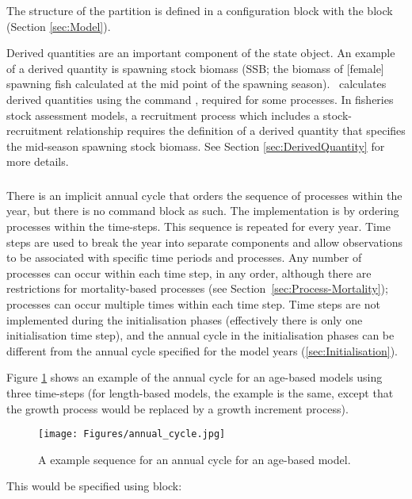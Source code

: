 The structure of the partition is defined in a configuration block with the  block (Section \ref{sec:Model}).

Derived quantities are an important component of the state object. An example of a derived quantity is spawning stock biomass (SSB; the biomass of [female] spawning fish calculated at the mid point of the spawning season). \CNAME\ calculates derived quantities using the command , required for some processes. In fisheries stock assessment models, a recruitment process which includes a stock-recruitment relationship requires the definition of a derived quantity that specifies the mid-season spawning stock biomass. See Section \ref{sec:DerivedQuantity} for more details.

\subsubsection{}\label{sec:TimeStep}

There is an implicit annual cycle that orders the sequence of processes within the year, but there is no command block as such. The implementation is by ordering processes within the time-steps. This sequence is repeated for every year. Time steps are used to break the year into separate components and allow observations to be associated with specific time periods and processes. Any number of processes can occur within each time step, in any order, although there are restrictions for mortality-based processes (see Section~\ref{sec:Process-Mortality}); processes can occur multiple times within each time step. Time steps are not implemented during the initialisation phases (effectively there is only one initialisation time step), and the annual cycle in the initialisation phases can be different from the annual cycle specified for the model years (\ref{sec:Initialisation}).

Figure \ref{Fig:annual} shows an example of the annual cycle for an age-based models using three time-steps (for length-based models, the example is the same, except that the growth process would be replaced by a growth increment process).

\begin{figure}
	\centering
	\texttt{[image: Figures/annual\_cycle.jpg]}
	\caption{A example sequence for an annual cycle for an age-based model.}\label{Fig:annual}
\end{figure}

This would be specified using  block:

